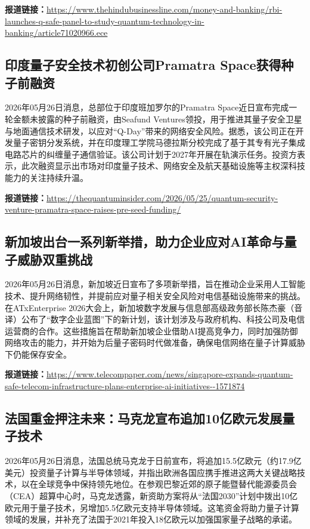 \documentclass[12pt,a4paper]{ctexart}
\begin{document}
\noindent\textbf{报道链接：}\url{https://www.thehindubusinessline.com/money-and-banking/rbi-launches-q-safe-panel-to-study-quantum-technology-in-banking/article71020966.ece}

\subsection{ 印度量子安全技术初创公司Pramatra Space获得种子前融资 }

2026年05月26日消息，总部位于印度班加罗尔的Pramatra Space近日宣布完成一轮金额未披露的种子前融资，由Seafund Ventures领投，用于推进其量子安全卫星与地面通信技术研发，以应对“Q-Day”带来的网络安全风险。据悉，该公司正在开发量子密钥分发系统，并在印度理工学院马德拉斯分校完成了基于其专有光子集成电路芯片的纠缠量子通信验证。该公司计划于2027年开展在轨演示任务。投资方表示，此次融资显示出市场对印度量子技术、网络安全及航天基础设施等主权深科技能力的关注持续升温。

\noindent\textbf{报道链接：}\url{https://thequantuminsider.com/2026/05/25/quantum-security-venture-pramatra-space-raises-pre-seed-funding/}

\subsection{ 新加坡出台一系列新举措，助力企业应对AI革命与量子威胁双重挑战 }

2026年05月26日消息，新加坡近日宣布了多项新举措，旨在推动企业采用人工智能技术、提升网络韧性，并提前应对量子相关安全风险对电信基础设施带来的挑战。在ATxEnterprise 2026大会上，新加坡数字发展与信息部高级政务部长陈杰豪（音译）公布了“数字企业蓝图”下的新计划，该计划涉及与政府机构、科技公司及电信运营商的合作。这些措施旨在帮助新加坡企业借助AI提高竞争力，同时加强防御网络攻击的能力，并开始为后量子密码时代做准备，确保电信网络在量子计算威胁下仍能保存安全。

\noindent\textbf{报道链接：}\url{https://www.telecompaper.com/news/singapore-expands-quantum-safe-telecom-infrastructure-plans-enterprise-ai-initiatives--1571874}

\subsection{ 法国重金押注未来：马克龙宣布追加10亿欧元发展量子技术 }

2026年05月26日消息，法国总统马克龙于日前宣布，将追加15.5亿欧元（约17.9亿美元）投资量子计算与半导体领域，并指出欧洲各国应携手推进这两大关键战略技术，以在全球竞争中保持领先地位。在参观巴黎近郊的原子能暨替代能源委员会（CEA）超算中心时，马克龙透露，新资助方案将从“法国2030”计划中拨出10亿欧元用于量子技术，另增加5.5亿欧元支持半导体领域。这笔资金将助力量子计算领域的发展，并补充了法国于2021年投入18亿欧元以加强国家量子战略的承诺。
\end{document}
